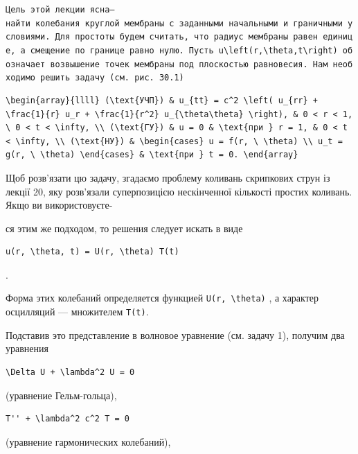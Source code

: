 \documentclass[
  ukrainian,
]{article}
\begin{document}
\texttt{Цель\ этой\ лекции\ ясна—найти\ колебания\ круглой\ мембраны\ с\ заданными\ начальными\ и\ граничными\ условиями.\ Для\ простоты\ будем\ считать,\ что\ радиус\ мембраны\ равен\ единице,\ а\ смещение\ по\ границе\ равно\ нулю.\ Пусть\ \textquotesingle{}u\textbackslash{}left(r,\textbackslash{}theta,t\textbackslash{}right)\textquotesingle{}\ обозначает\ возвышение\ точек\ мембраны\ под\ плоскостью\ равновесия.\ Нам\ необходимо\ решить\ задачу\ (см.\ рис.\ 30.1)}

\begin{verbatim}
\begin{array}{llll} (\text{УЧП}) & u_{tt} = c^2 \left( u_{rr} + \frac{1}{r} u_r + \frac{1}{r^2} u_{\theta\theta} \right), & 0 < r < 1, \ 0 < t < \infty, \\ (\text{ГУ}) & u = 0 & \text{при } r = 1, & 0 < t < \infty, \\ (\text{НУ}) & \begin{cases} u = f(r, \ \theta) \\ u_t = g(r, \ \theta) \end{cases} & \text{при } t = 0. \end{array}
\end{verbatim}

Щоб розв'язати цю задачу, згадаємо проблему коливань скрипкових струн із
лекції 20, яку розв'язали суперпозицією нескінченної кількості простих
коливань. Якщо ви використовуєте-

ся этим же подходом, то решения следует искать в виде

\begin{verbatim}
u(r, \theta, t) = U(r, \theta) T(t)
\end{verbatim}

.

Форма этих колебаний определяется функцией
\texttt{U(r,\ \textbackslash{}theta)} , а характер осцилляций ---
множителем \texttt{T(t)}.

Подставив это представление в волновое уравнение (см. задачу 1), получим
два уравнения

\begin{verbatim}
\Delta U + \lambda^2 U = 0
\end{verbatim}

(уравнение Гельм-гольца),

\begin{verbatim}
T'' + \lambda^2 c^2 T = 0
\end{verbatim}

(уравнение гармонических колебаний),
\end{document}
